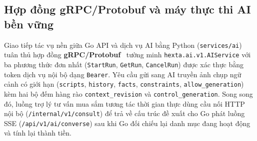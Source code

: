 \subsection{Hợp đồng gRPC/Protobuf và máy thực thi AI bền vững}
Giao tiếp tác vụ nền giữa Go API và dịch vụ AI bằng Python (\texttt{services/\hspace{0pt}ai}) tuân thủ hợp đồng \textbf{gRPC/\hspace{0pt}Protobuf}~\cite{grpcdocs} tường minh \texttt{hexta.\hspace{0pt}ai.\hspace{0pt}v1.\hspace{0pt}AIService} với ba phương thức đơn nhất
(\texttt{StartRun}, \texttt{GetRun}, \texttt{CancelRun}) được xác thực bằng token dịch vụ nội bộ dạng \texttt{Bearer}. Yêu cầu gửi sang AI truyền ảnh chụp ngữ cảnh có giới hạn (\texttt{scripts},
\texttt{history}, \texttt{facts}, \texttt{constraints}, \texttt{allow\_\hspace{0pt}generation}) kèm hai bộ đếm hàng rào \texttt{context\_\hspace{0pt}revision} và \texttt{control\_\hspace{0pt}generation}. Song song đó, luồng trợ lý
tư vấn mua sắm tương tác thời gian thực dùng cầu nối HTTP nội bộ (\texttt{/internal/\hspace{0pt}v1/\hspace{0pt}consult}) để trả về cấu trúc đề xuất cho Go phát luồng SSE (\texttt{/api/\hspace{0pt}v1/\hspace{0pt}ai/\hspace{0pt}converse}) sau khi Go đối
chiếu lại danh mục đang hoạt động và tính lại thành tiền.

